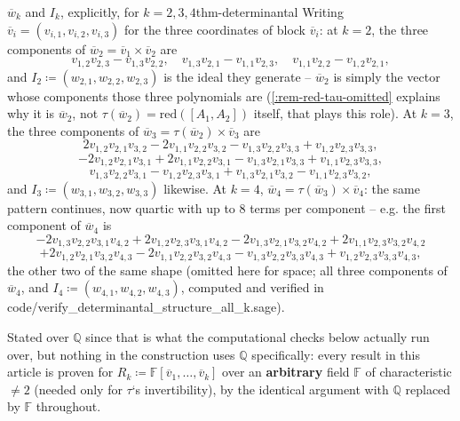 \documentclass[a4paper,11pt]{scrartcl}
\begin{document}
\begin{example}{{}\({\overline{w}}_{k}\) and \(I_{k}\), explicitly, for \(k = 2,3,4\)}{thm-determinantal} Writing \({\overline{v}}_{i} = \left( v_{i,1},v_{i,2},v_{i,3} \right)\) for the three coordinates of block \({\overline{v}}_{i}\): at \(k = 2\), the three components of \({\overline{w}}_{2} = {\overline{v}}_{1} \times {\overline{v}}_{2}\) are \[v_{1,2}v_{2,3} - v_{1,3}v_{2,2},\quad v_{1,3}v_{2,1} - v_{1,1}v_{2,3},\quad v_{1,1}v_{2,2} - v_{1,2}v_{2,1},\] and \(I_{2} ≔ \left( w_{2,1},w_{2,2},w_{2,3} \right)\) is the ideal they generate -- \({\overline{w}}_{2}\) is simply the vector whose components those three polynomials are (\cref{:rem-red-tau-omitted} explains why it is \({\overline{w}}_{2}\), not \(\tau({\overline{w}}_{2}) = \text{red}\left( \left\lbrack A_{1},A_{2} \right\rbrack \right)\) itself, that plays this role). At \(k = 3\), the three components of \({\overline{w}}_{3} = \tau({\overline{w}}_{2}) \times {\overline{v}}_{3}\) are \[2v_{1,2}v_{2,1}v_{3,2} - 2v_{1,1}v_{2,2}v_{3,2} - v_{1,3}v_{2,2}v_{3,3} + v_{1,2}v_{2,3}v_{3,3},\] \[- 2v_{1,2}v_{2,1}v_{3,1} + 2v_{1,1}v_{2,2}v_{3,1} - v_{1,3}v_{2,1}v_{3,3} + v_{1,1}v_{2,3}v_{3,3},\] \[v_{1,3}v_{2,2}v_{3,1} - v_{1,2}v_{2,3}v_{3,1} + v_{1,3}v_{2,1}v_{3,2} - v_{1,1}v_{2,3}v_{3,2},\] and \(I_{3} ≔ \left( w_{3,1},w_{3,2},w_{3,3} \right)\) likewise. At \(k = 4\), \({\overline{w}}_{4} = \tau({\overline{w}}_{3}) \times {\overline{v}}_{4}\): the same pattern continues, now quartic with up to 8 terms per component -- e.g. the first component of \({\overline{w}}_{4}\) is \[- 2v_{1,3}v_{2,2}v_{3,1}v_{4,2} + 2v_{1,2}v_{2,3}v_{3,1}v_{4,2} - 2v_{1,3}v_{2,1}v_{3,2}v_{4,2} + 2v_{1,1}v_{2,3}v_{3,2}v_{4,2}\] \[+ 2v_{1,2}v_{2,1}v_{3,2}v_{4,3} - 2v_{1,1}v_{2,2}v_{3,2}v_{4,3} - v_{1,3}v_{2,2}v_{3,3}v_{4,3} + v_{1,2}v_{2,3}v_{3,3}v_{4,3},\] the other two of the same shape (omitted here for space; all three components of \({\overline{w}}_{4}\), and \(I_{4} ≔ \left( w_{4,1},w_{4,2},w_{4,3} \right)\), computed and verified in code/verify\_determinantal\_structure\_all\_k.sage).

\end{example}

Stated over \(\mathbb{Q}\) since that is what the computational checks below actually run over, but nothing in the construction uses \(\mathbb{Q}\) specifically: every result in this article is proven for \(R_{k} ≔ \mathbb{F}\left\lbrack {\overline{v}}_{1},\ldots,{\overline{v}}_{k} \right\rbrack\) over an \textbf{arbitrary} field \(\mathbb{F}\) of characteristic \(\neq 2\) (needed only for \(\tau\)`s invertibility), by the identical argument with \(\mathbb{Q}\) replaced by \(\mathbb{F}\) throughout.
\end{document}
